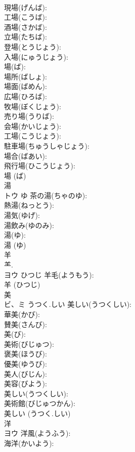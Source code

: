 \documentclass[8pt]{extreport}
\begin{document}
\begin{CJK}{UTF8}{min}
\\	現場(げんば): 
\\	工場(こうば): 
\\	酒場(さかば): 
\\	立場(たちば): 
\\	登場(とうじょう): 
\\	入場(にゅうじょう): 
\\	場(ば): 
\\	場所(ばしょ): 
\\	場面(ばめん): 
\\	広場(ひろば): 
\\	牧場(ぼくじょう): 
\\	売り場(うりば): 
\\	会場(かいじょう): 
\\	工場(こうじょう): 
\\	駐車場(ちゅうしゃじょう): 
\\	場合(ばあい): 
\\	飛行場(ひこうじょう): 
\\	場 (ば)
\\	湯		
\\	トウ	ゆ	茶の湯(ちゃのゆ): 
\\	熱湯(ねっとう): 
\\	湯気(ゆげ): 
\\	湯飲み(ゆのみ): 
\\	湯(ゆ): 
\\	湯 (ゆ)
\\	羊		
\\	⺷. 
\\	ヨウ	ひつじ	羊毛(ようもう): 
\\	羊 (ひつじ)
\\	美			
\\	ビ、ミ	うつく.しい	美しい(うつくしい): 
\\	華美(かび): 
\\	賛美(さんび): 
\\	美(び): 
\\	美術(びじゅつ): 
\\	褒美(ほうび): 
\\	優美(ゆうび): 
\\	美人(びじん): 
\\	美容(びよう): 
\\	美しい(うつくしい): 
\\	美術館(びじゅつかん): 
\\	美しい (うつく.しい)
\\	洋			
\\	ヨウ		洋風(ようふう): 
\\	海洋(かいよう): 

\end{CJK}
\end{document}
